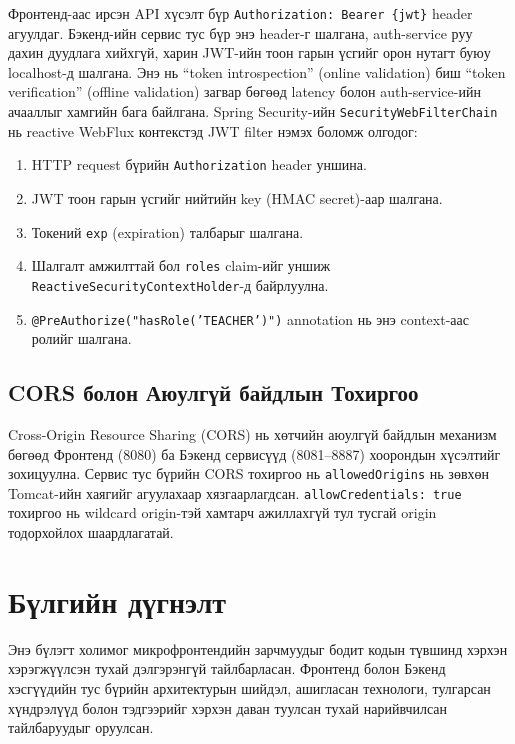 Фронтенд-аас ирсэн API хүсэлт бүр \texttt{Authorization: Bearer
\{jwt\}} header агуулдаг. Бэкенд-ийн сервис тус бүр энэ header-г
шалгана, auth-service руу дахин дуудлага хийхгүй, харин JWT-ийн
тоон гарын үсгийг орон нутагт буюу localhost-д
шалгана. Энэ нь ``token introspection'' (online validation) биш
``token verification'' (offline validation) загвар бөгөөд latency
болон auth-service-ийн ачааллыг хамгийн бага байлгана.
Spring Security-ийн \texttt{SecurityWebFilterChain} нь reactive
WebFlux контекстэд JWT filter нэмэх боломж олгодог:

\begin{enumerate}
  \item HTTP request бүрийн \texttt{Authorization} header уншина.
  \item JWT тоон гарын үсгийг нийтийн key (HMAC secret)-аар шалгана.
  \item Токений \texttt{exp} (expiration) талбарыг шалгана.
  \item Шалгалт амжилттай бол \texttt{roles} claim-ийг уншиж
    \texttt{ReactiveSecurityContextHolder}-д байрлуулна.
  \item \texttt{@PreAuthorize("hasRole('TEACHER')")} annotation нь
    энэ context-аас ролийг шалгана.
\end{enumerate}

\subsection{CORS болон Аюулгүй байдлын Тохиргоо}

Cross-Origin Resource Sharing (CORS) нь хөтчийн аюулгүй байдлын
механизм бөгөөд Фронтенд (8080) ба Бэкенд сервисүүд (8081--8887)
хоорондын хүсэлтийг зохицуулна. Сервис тус бүрийн CORS тохиргоо нь
\texttt{allowedOrigins} нь зөвхөн Tomcat-ийн хаягийг агуулахаар
хязгаарлагдсан. \texttt{allowCredentials: true} тохиргоо нь wildcard
origin-тэй хамтарч ажиллахгүй тул тусгай origin тодорхойлох
шаардлагатай.

\section{Бүлгийн дүгнэлт}
Энэ бүлэгт холимог микрофронтендийн зарчмуудыг бодит кодын түвшинд хэрхэн хэрэгжүүлсэн тухай дэлгэрэнгүй тайлбарласан. Фронтенд болон Бэкенд хэсгүүдийн тус бүрийн архитектурын шийдэл, ашигласан технологи, тулгарсан хүндрэлүүд болон тэдгээрийг хэрхэн даван туулсан тухай нарийвчилсан тайлбаруудыг оруулсан.
